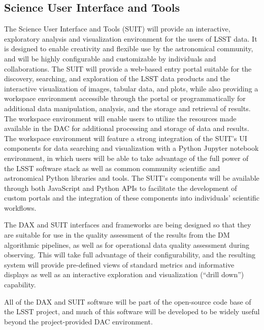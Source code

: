 \subsection{Science User Interface and Tools} 

The Science User Interface and Tools (SUIT) will provide an interactive, exploratory analysis and visualization 
environment for the users of LSST data. It is designed to enable creativity and flexible use by the astronomical 
community, and will be highly configurable and customizable by individuals and collaborations. The SUIT will 
provide a web-based entry portal suitable for the discovery, searching, and exploration of the LSST data products 
and the interactive visualization of images, tabular data, and plots, while also providing a workspace environment 
accessible through the portal or programmatically for additional data manipulation, analysis, and the storage and 
retrieval of results. The workspace environment will enable users to utilize the resources made available in the 
DAC for additional processing and storage of data and results. The workspace environment will feature a strong 
integration of the SUIT's UI components for data searching and visualization with a Python Jupyter notebook 
environment, in which users will be able to take advantage of the full power of the LSST software stack as well as 
common community scientific and astronomical Python libraries and tools. The SUIT's components will be available 
through both JavaScript and Python APIs to facilitate the development of 
custom portals and the integration of these components into individuals' scientific workflows.

The DAX and SUIT interfaces and frameworks are being designed so that they are suitable for use in the quality 
assessment of the results from the DM algorithmic pipelines, as well as for operational data quality assessment 
during observing. This will take full advantage of their configurability, and the resulting system will provide 
pre-defined views of standard metrics and informative displays as well as an interactive exploration and 
visualization (``drill down'') capability.

All of the DAX and SUIT software will be part of the open-source code base of the LSST project, and much of this 
software will be developed to be widely useful beyond the project-provided DAC environment.


